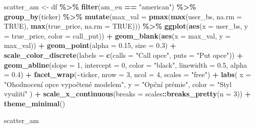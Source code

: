 \documentclass[
]{article}
\newenvironment{Shaded}{\begin{snugshade}}{\end{snugshade}}
\newcommand{\AttributeTok}[1]{\textcolor[rgb]{0.13,0.29,0.53}{#1}}
\newcommand{\ConstantTok}[1]{\textcolor[rgb]{0.56,0.35,0.01}{#1}}
\newcommand{\DecValTok}[1]{\textcolor[rgb]{0.00,0.00,0.81}{#1}}
\newcommand{\FloatTok}[1]{\textcolor[rgb]{0.00,0.00,0.81}{#1}}
\newcommand{\FunctionTok}[1]{\textcolor[rgb]{0.13,0.29,0.53}{\textbf{#1}}}
\newcommand{\NormalTok}[1]{#1}
\newcommand{\OtherTok}[1]{\textcolor[rgb]{0.56,0.35,0.01}{#1}}
\newcommand{\SpecialCharTok}[1]{\textcolor[rgb]{0.81,0.36,0.00}{\textbf{#1}}}
\newcommand{\StringTok}[1]{\textcolor[rgb]{0.31,0.60,0.02}{#1}}
\begin{document}
\begin{Shaded}
\begin{Highlighting}[]
\NormalTok{scatter\_am }\OtherTok{\textless{}{-}}\NormalTok{ df }\SpecialCharTok{\%\textgreater{}\%}
  \FunctionTok{filter}\NormalTok{(am\_eu }\SpecialCharTok{==} \StringTok{"american"}\NormalTok{) }\SpecialCharTok{\%\textgreater{}\%}
  \FunctionTok{group\_by}\NormalTok{(ticker) }\SpecialCharTok{\%\textgreater{}\%}
  \FunctionTok{mutate}\NormalTok{(}\AttributeTok{max\_val =} \FunctionTok{pmax}\NormalTok{(}\FunctionTok{max}\NormalTok{(user\_bs, }\AttributeTok{na.rm =} \ConstantTok{TRUE}\NormalTok{),}
                         \FunctionTok{max}\NormalTok{(true\_price, }\AttributeTok{na.rm =} \ConstantTok{TRUE}\NormalTok{))) }\SpecialCharTok{\%\textgreater{}\%}
  \FunctionTok{ggplot}\NormalTok{(}\FunctionTok{aes}\NormalTok{(}\AttributeTok{x =}\NormalTok{ user\_bs, }\AttributeTok{y =}\NormalTok{ true\_price, }\AttributeTok{color =}\NormalTok{ call\_put)) }\SpecialCharTok{+}
  \FunctionTok{geom\_blank}\NormalTok{(}\FunctionTok{aes}\NormalTok{(}\AttributeTok{x =}\NormalTok{ max\_val, }\AttributeTok{y =}\NormalTok{ max\_val)) }\SpecialCharTok{+}
  \FunctionTok{geom\_point}\NormalTok{(}\AttributeTok{alpha =} \FloatTok{0.15}\NormalTok{, }\AttributeTok{size =} \FloatTok{0.3}\NormalTok{) }\SpecialCharTok{+}
  \FunctionTok{scale\_color\_discrete}\NormalTok{(}\AttributeTok{labels =} \FunctionTok{c}\NormalTok{(}\AttributeTok{calls =} \StringTok{"Call opce"}\NormalTok{, }\AttributeTok{puts =} \StringTok{"Put opce"}\NormalTok{)) }\SpecialCharTok{+}
  \FunctionTok{geom\_abline}\NormalTok{(}\AttributeTok{slope =} \DecValTok{1}\NormalTok{, }\AttributeTok{intercept =} \DecValTok{0}\NormalTok{, }\AttributeTok{color =} \StringTok{"black"}\NormalTok{, }\AttributeTok{linewidth =} \FloatTok{0.5}\NormalTok{, }\AttributeTok{alpha =} \FloatTok{0.4}\NormalTok{) }\SpecialCharTok{+}
  \FunctionTok{facet\_wrap}\NormalTok{(}\SpecialCharTok{\textasciitilde{}}\NormalTok{ticker, }\AttributeTok{nrow =} \DecValTok{3}\NormalTok{, }\AttributeTok{ncol =} \DecValTok{4}\NormalTok{, }\AttributeTok{scales =} \StringTok{"free"}\NormalTok{) }\SpecialCharTok{+}
  \FunctionTok{labs}\NormalTok{(}
    \AttributeTok{x =} \StringTok{"Ohodnocení opce vypočtené modelem"}\NormalTok{,}
    \AttributeTok{y =} \StringTok{"Opční prémie"}\NormalTok{,}
    \AttributeTok{color =} \StringTok{"Styl využití"}
\NormalTok{  ) }\SpecialCharTok{+}
  \FunctionTok{scale\_x\_continuous}\NormalTok{(}\AttributeTok{breaks =}\NormalTok{ scales}\SpecialCharTok{::}\FunctionTok{breaks\_pretty}\NormalTok{(}\AttributeTok{n =} \DecValTok{3}\NormalTok{)) }\SpecialCharTok{+}
  \FunctionTok{theme\_minimal}\NormalTok{()}

\NormalTok{scatter\_am}
\end{Highlighting}
\end{Shaded}
\end{document}
